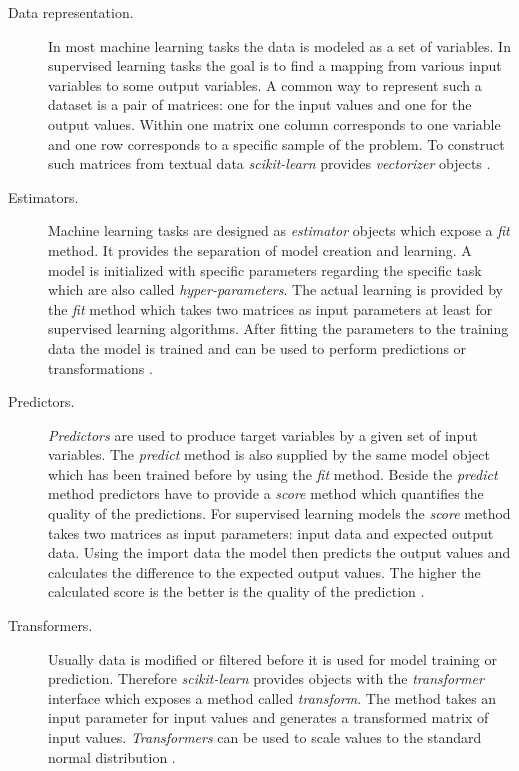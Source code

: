 \begin{description}
  \item [Data representation.]
    In most machine learning tasks the data is modeled as a set of variables.
    In supervised learning tasks the goal is to find a mapping from various input variables to some output variables.
    A common way to represent such a dataset is a pair of matrices: one for the input values and one for the output values.
    Within one matrix one column corresponds to one variable and one row corresponds to a specific sample of the problem.
    To construct such matrices from textual data \emph{scikit-learn} provides \emph{vectorizer} objects
    \cite{buitinck2013api}.

  \item [Estimators.]
    Machine learning tasks are designed as \emph{estimator} objects which expose a \emph{fit} method.
    It provides the separation of model creation and learning.
    A model is initialized with specific parameters regarding the specific task which are also called \emph{hyper-parameters}.
    The actual learning is provided by the \emph{fit} method which takes two matrices as input parameters at least for supervised learning algorithms.
    After fitting the parameters to the training data the model is trained and can be used to perform predictions or transformations
    \cite{buitinck2013api}.

  \item [Predictors.]
    \emph{Predictors} are used to produce target variables by a given set of input variables.
    The \emph{predict} method is also supplied by the same model object which has been trained before by using the \emph{fit} method.
    Beside the \emph{predict} method predictors have to provide a \emph{score} method which quantifies the quality of the predictions.
    For supervised learning models the \emph{score} method takes two matrices as input parameters: input data and expected output data.
    Using the import data the model then predicts the output values and calculates the difference to the expected output values.
    The higher the calculated score is the better is the quality of the prediction
    \cite{buitinck2013api}.

  \item [Transformers.]
    Usually data is modified or filtered before it is used for model training or prediction.
    Therefore \emph{scikit-learn} provides objects with the \emph{transformer} interface which exposes a method called \emph{transform}.
    The method takes an input parameter for input values and generates a transformed matrix of input values.
    \emph{Transformers} can be used to scale values to the standard normal distribution
    \cite{buitinck2013api}.

\end{description}


